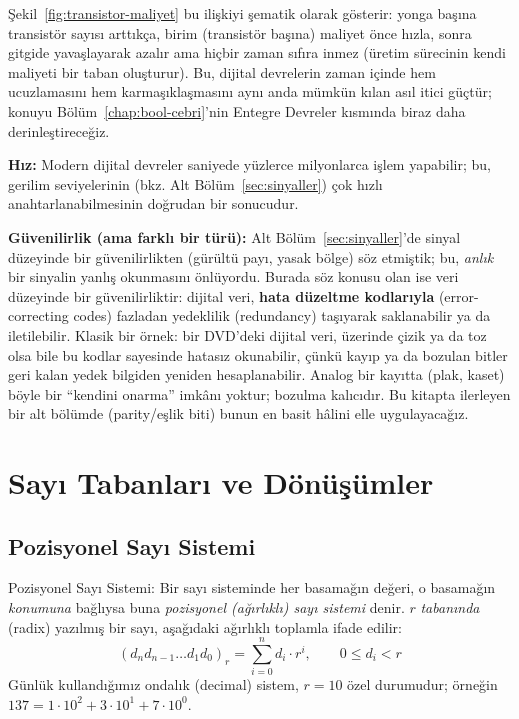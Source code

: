 Şekil~\ref{fig:transistor-maliyet} bu ilişkiyi şematik olarak gösterir: yonga başına
transistör sayısı arttıkça, birim (transistör başına) maliyet önce hızla, sonra gitgide
yavaşlayarak azalır ama hiçbir zaman sıfıra inmez (üretim sürecinin kendi maliyeti bir
taban oluşturur). Bu, dijital devrelerin zaman içinde hem ucuzlamasını hem karmaşıklaşmasını
aynı anda mümkün kılan asıl itici güçtür; konuyu Bölüm~\ref{chap:bool-cebri}'nin Entegre
Devreler kısmında biraz daha derinleştireceğiz.

\textbf{Hız:} Modern dijital devreler saniyede yüzlerce milyonlarca işlem yapabilir; bu,
gerilim seviyelerinin (bkz. Alt Bölüm~\ref{sec:sinyaller}) çok hızlı anahtarlanabilmesinin
doğrudan bir sonucudur.

\textbf{Güvenilirlik (ama farklı bir türü):} Alt Bölüm~\ref{sec:sinyaller}'de sinyal
düzeyinde bir güvenilirlikten (gürültü payı, yasak bölge) söz etmiştik; bu, \emph{anlık} bir
sinyalin yanlış okunmasını önlüyordu. Burada söz konusu olan ise veri düzeyinde bir
güvenilirliktir: dijital veri, \textbf{hata düzeltme kodlarıyla} (error-correcting codes)
fazladan yedeklilik (redundancy) taşıyarak saklanabilir ya da iletilebilir. Klasik bir örnek:
bir DVD'deki dijital veri, üzerinde çizik ya da toz olsa bile bu kodlar sayesinde hatasız
okunabilir, çünkü kayıp ya da bozulan bitler geri kalan yedek bilgiden yeniden hesaplanabilir.
Analog bir kayıtta (plak, kaset) böyle bir ``kendini onarma'' imkânı yoktur; bozulma
kalıcıdır. Bu kitapta ilerleyen bir alt bölümde (parity/eşlik biti) bunun en basit hâlini elle
uygulayacağız.

\section{Sayı Tabanları ve Dönüşümler}
\label{sec:sayi-tabanlari}

\subsection{Pozisyonel Sayı Sistemi}
\label{sec:pozisyonel-sistem}

\begin{tanim}{Pozisyonel Sayı Sistemi:}
Bir sayı sisteminde her basamağın değeri, o basamağın \emph{konumuna} bağlıysa buna
\emph{pozisyonel (ağırlıklı) sayı sistemi} denir. $r$
\emph{tabanında} (radix) yazılmış bir sayı, aşağıdaki ağırlıklı toplamla
ifade edilir:
\[
(d_n d_{n-1} \ldots d_1 d_0)_r = \sum_{i=0}^{n} d_i \cdot r^i, \qquad 0 \le d_i < r
\]
Günlük kullandığımız ondalık (decimal) sistem, $r=10$ özel durumudur; örneğin
$137 = 1\cdot10^2+3\cdot10^1+7\cdot10^0$.
\end{tanim}

